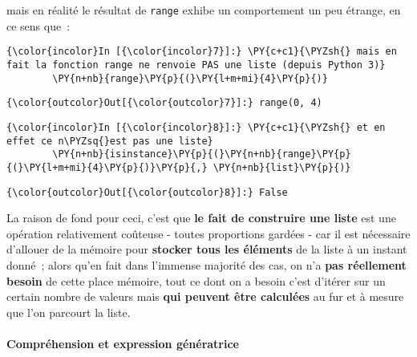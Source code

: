     mais en réalité le résultat de \texttt{range} exhibe un comportement un
peu étrange, en ce sens que~:

    \begin{Verbatim}[commandchars=\\\{\}]
{\color{incolor}In [{\color{incolor}7}]:} \PY{c+c1}{\PYZsh{} mais en fait la fonction range ne renvoie PAS une liste (depuis Python 3)}
        \PY{n+nb}{range}\PY{p}{(}\PY{l+m+mi}{4}\PY{p}{)}
\end{Verbatim}


\begin{Verbatim}[commandchars=\\\{\}]
{\color{outcolor}Out[{\color{outcolor}7}]:} range(0, 4)
\end{Verbatim}
            
    \begin{Verbatim}[commandchars=\\\{\}]
{\color{incolor}In [{\color{incolor}8}]:} \PY{c+c1}{\PYZsh{} et en effet ce n\PYZsq{}est pas une liste}
        \PY{n+nb}{isinstance}\PY{p}{(}\PY{n+nb}{range}\PY{p}{(}\PY{l+m+mi}{4}\PY{p}{)}\PY{p}{,} \PY{n+nb}{list}\PY{p}{)}
\end{Verbatim}


\begin{Verbatim}[commandchars=\\\{\}]
{\color{outcolor}Out[{\color{outcolor}8}]:} False
\end{Verbatim}
            
    La raison de fond pour ceci, c'est que \textbf{le fait de construire une
liste} est une opération relativement coûteuse - toutes proportions
gardées - car il est nécessaire d'allouer de la mémoire pour
\textbf{stocker tous les éléments} de la liste à un instant donné~;
alors qu'en fait dans l'immense majorité des cas, on n'a \textbf{pas
réellement besoin} de cette place mémoire, tout ce dont on a besoin
c'est d'itérer sur un certain nombre de valeurs mais \textbf{qui peuvent
être calculées} au fur et à mesure que l'on parcourt la liste.

    \hypertarget{compruxe9hension-et-expression-guxe9nuxe9ratrice}{%
\paragraph{Compréhension et expression
génératrice\\\\}\label{compruxe9hension-et-expression-guxe9nuxe9ratrice}}

